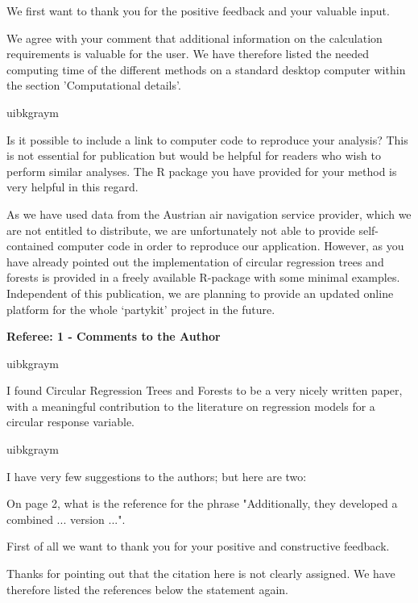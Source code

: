 \documentclass[english, noconfig]{uibklttr}
\newcommand{\section}[1]{{\Large{\textbf{#1}}}}
\newenvironment{re}{
    \begin{color}{uibkgraym}
        \itshape
}{
    \end{color}
}
\begin{document}
We first want to thank you for the positive feedback and your valuable input. 

We agree with your comment that additional information on the calculation
requirements is valuable for the user. We have therefore listed the needed
computing time of the different methods on a standard desktop computer within
the section 'Computational details'.

\vspace{0.5em}
\begin{re}
Is it possible to include a link to computer code to reproduce your
analysis? This is not essential for publication but would be helpful for
readers who wish to perform similar analyses. The R package you have provided
for your method is very helpful in this regard.  
\end{re}

As we have used data from the Austrian air navigation service provider, which
we are not entitled to distribute, we are unfortunately not able to provide
self-contained computer code in order to reproduce our application. However, as you have already
pointed out the implementation of circular regression trees and forests is
provided in a freely available R-package with some minimal examples.
Independent of this publication, we are planning to provide an updated online
platform for the whole `partykit' project in the future.

\newpage

\section{Referee: 1 - Comments to the Author}

\begin{re}
I found Circular Regression Trees and Forests to be a very nicely written
paper, with a meaningful contribution to the literature on regression models
for a circular response variable. 
\end{re}

\begin{re}
I have very few suggestions to the authors; but here are two:

On page 2, what is the reference for the phrase "Additionally, they
developed a combined ... version ...".
\end{re}

First of all we want to thank you for your positive and constructive feedback.

Thanks for pointing out that the citation here is not clearly assigned. We have therefore
listed the references below the statement again.
\end{document}
